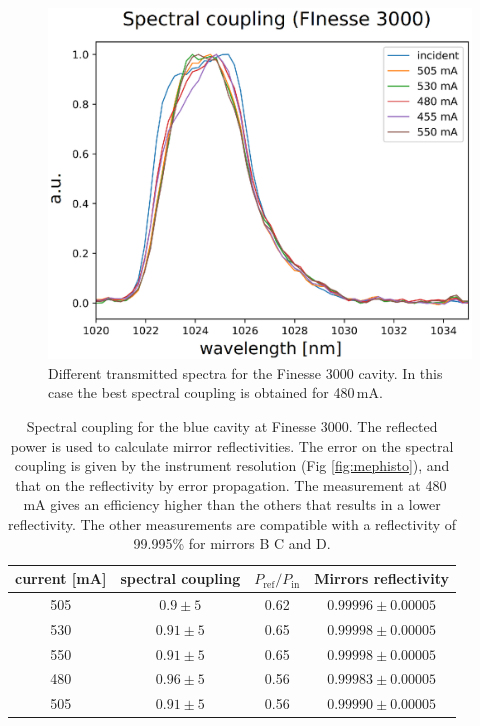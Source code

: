 \begin{figure}
	\centering
	\includegraphics[width=0.9\linewidth]{images/accspe.eps}
	\caption{Different transmitted spectra for the Finesse 3000 cavity. In this case the best spectral coupling is obtained for 480\,mA.}
	\label{fig:accspe}
\end{figure}
\begin{table}
	\centering
	\begin{tabular}{|c|c|c|c|}
		\hline 
		current [mA]&spectral coupling & $P_\mathrm{ref}/P_\mathrm{in} $ & Mirrors reflectivity\\ 
		\hline 
		505	& $0.9\pm5$ & 0.62 & $0.99996 \pm0.00005$ \\ 
		\hline 
		530	& $0.91\pm5$ & 0.65 & $0.99998 \pm0.00005$\\ 
		\hline 
		550	& $0.91\pm5$ & 0.65 &$0.99998 \pm0.00005$ \\ 
		\hline
		480	& $0.96\pm5$ & 0.56 &$0.99983 \pm0.00005$ \\ 
		\hline
		505	& $0.91\pm5$ & 0.56 &$0.99990 \pm0.00005$ \\ 
		\hline
	\end{tabular}
	\caption{Spectral coupling for the blue cavity at Finesse 3000. The reflected power is used to calculate mirror reflectivities. The error on the spectral coupling is given by the instrument resolution (Fig \ref{fig:mephisto}), and that on the reflectivity by error propagation. The measurement at 480\,mA gives an efficiency higher than the others that results in a lower reflectivity. The other measurements are compatible with a reflectivity of 99.995\% for mirrors B C and D.}
	\label{tab:coup3000}
\end{table}

